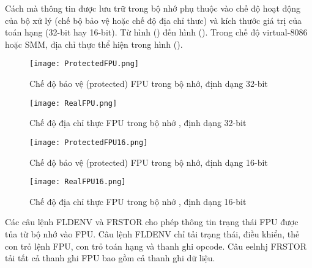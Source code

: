 	Cách mà thông tin được lưu trữ trong bộ nhớ phụ thuộc vào chế độ hoạt động của bộ xử lý (chế bộ bảo vệ hoặc chế độ địa chỉ thưc) và kích thước giá trị của toán hạng (32-bit hay 16-bit). Từ hình ()  đến hình (). Trong chế độ virtual-8086 hoặc SMM, địa chỉ thực thể hiện trong hình ().
	\begin{center}
			\begin{figure}[htp]
				\begin{center}
					\texttt{[image: ProtectedFPU.png]}
				\end{center}
				\caption{Chế độ bảo vệ (protected) FPU trong bộ nhớ, định dạng 32-bit}				
				\label{fig:ProtectedFPU}				
			\end{figure}
		\end{center}	

		\begin{center}
			\begin{figure}[htp]
				\begin{center}
					\texttt{[image: RealFPU.png]}
				\end{center}
				\caption{Chế độ địa chỉ thực FPU trong bộ nhớ , định dạng 32-bit}				
				\label{fig:ProtectedFPU}				
			\end{figure}
		\end{center}	
		
		\begin{center}
			\begin{figure}[htp]
				\begin{center}
					\texttt{[image: ProtectedFPU16.png]}
				\end{center}
				\caption{Chế độ bảo vệ (protected) FPU trong bộ nhớ, định dạng 16-bit}				
				\label{fig:ProtectedFP16U}				
			\end{figure}
		\end{center}	

		\begin{center}
			\begin{figure}[htp]
				\begin{center}
					\texttt{[image: RealFPU16.png]}
				\end{center}
				\caption{Chế độ địa chỉ thực FPU trong bộ nhớ , định dạng 16-bit}				
				\label{fig:ProtectedFPU16}				
			\end{figure}
		\end{center}	
		
	Các câu lệnh FLDENV và FRSTOR cho phép thông tin trạng thái FPU được tủa từ bộ nhớ vào FPU. Câu lệnh FLDENV chỉ tải trạng thái, điều khiển, thẻ con trỏ lệnh FPU, con trỏ toán hạng và thanh ghi opcode. Câu eelnhj FRSTOR tải tất cả thanh ghi FPU bao gồm cả thanh ghi dữ liệu.		
		
